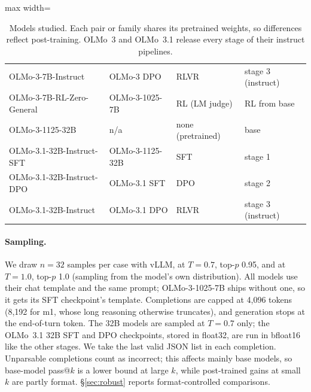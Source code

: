 \documentclass[11pt]{article}
\begin{document}
\begin{table}[t]
\begin{adjustbox}{max width=\linewidth}
\begin{tabular}{llll}
OLMo-3-7B-Instruct & OLMo-3 DPO & RLVR & stage 3 (instruct) \\
OLMo-3-7B-RL-Zero-General & OLMo-3-1025-7B & RL (LM judge) & RL from base \\
\midrule
OLMo-3-1125-32B & n/a & none (pretrained) & base \\
OLMo-3.1-32B-Instruct-SFT & OLMo-3-1125-32B & SFT & stage 1 \\
OLMo-3.1-32B-Instruct-DPO & OLMo-3.1 SFT & DPO & stage 2 \\
OLMo-3.1-32B-Instruct & OLMo-3.1 DPO & RLVR & stage 3 (instruct) \\
\bottomrule
\end{tabular}
\end{adjustbox}
\caption{Models studied. Each pair or family shares its pretrained weights, so differences reflect post-training. OLMo~3 and OLMo~3.1 release every stage of their instruct pipelines.}
\label{tab:models}
\end{table}

\paragraph{Sampling.}
We draw $n{=}32$ samples per case with vLLM, at $T{=}0.7$, top-$p$ 0.95, and at $T{=}1.0$, top-$p$ 1.0 (sampling from the model's own distribution). All models use their chat template and the same prompt; OLMo-3-1025-7B ships without one, so it gets its SFT checkpoint's template.
Completions are capped at 4,096 tokens (8,192 for m1, whose long reasoning otherwise truncates), and generation stops at the end-of-turn token. The 32B models are sampled at $T{=}0.7$ only; the OLMo~3.1 32B SFT and DPO checkpoints, stored in float32, are run in bfloat16 like the other stages.
We take the last valid JSON list in each completion. Unparsable completions count as incorrect; this affects mainly base models, so base-model pass@$k$ is a lower bound at large $k$, while post-trained gains at small $k$ are partly format. \S\ref{sec:robust} reports format-controlled comparisons.
\end{document}
